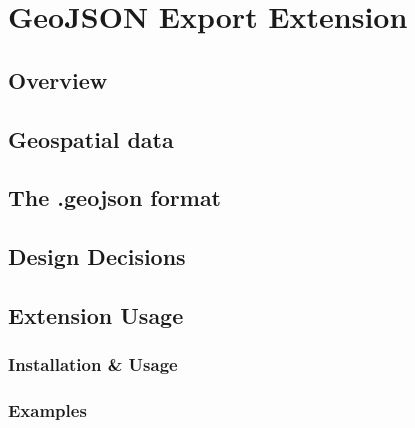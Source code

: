 \chapter{GeoJSON Export Extension}
\section{Overview}
\lipsum[3-6]
\section{Geospatial data}
\lipsum[7-9]
\section{The .geojson format}
\lipsum[13-16]
\section{Design Decisions}
\lipsum[16-17]
\section{Extension Usage}
\subsection{Installation \& Usage}
\lipsum[18-20]
\subsection{Examples}
\lipsum[1-5]